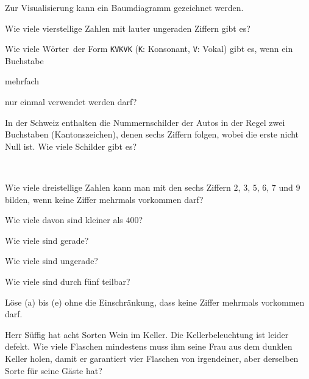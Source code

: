 \documentclass[%
11pt,%
twoside,%
titlepage,%
german,%
headsepline%
]{scrartcl}
\begin{document}
\begin{bem}
Zur Visualisierung kann ein Baumdiagramm gezeichnet werden.
\end{bem}


\begin{ueb}
Wie viele vierstellige Zahlen mit lauter ungeraden Ziffern gibt es?
\end{ueb}

\begin{ueb}
Wie viele \glqq Wörter\grqq\ der Form \texttt{KVKVK} (\texttt{K}: Konsonant, \texttt{V}: Vokal) gibt es, wenn ein Buchstabe \begin{enumeratea}
\item mehrfach
\item nur einmal verwendet werden darf?
\end{enumeratea}
\end{ueb}

\begin{ueb}[Autonummern]
In der Schweiz enthalten die Nummernschilder der Autos in der Regel zwei Buchstaben (Kantonszeichen), denen sechs Ziffern folgen, wobei die erste nicht Null ist. Wie viele Schilder gibt es?
\end{ueb}

\begin{ueb}
\ \\[-4ex]
\begin{enumeratea}
\item Wie viele dreistellige Zahlen kann man mit den sechs Ziffern $2$, $3$, $5$, $6$, $7$ und $9$ bilden, wenn keine Ziffer mehrmals vorkommen darf?
\item Wie viele davon sind kleiner als 400?
\item Wie viele sind gerade?
\item Wie viele sind ungerade?
\item Wie viele sind durch fünf teilbar?
\item Löse (a) bis (e) ohne die Einschränkung, dass keine Ziffer mehrmals vorkommen darf.
\end{enumeratea}
\end{ueb}

\begin{ueb}
Herr Süffig hat acht Sorten Wein im Keller. Die Kellerbeleuchtung ist leider defekt. Wie viele Flaschen mindestens muss ihm seine Frau aus dem dunklen Keller holen, damit er garantiert vier Flaschen von irgendeiner, aber derselben Sorte für seine Gäste hat?
\end{ueb}
\end{document}
